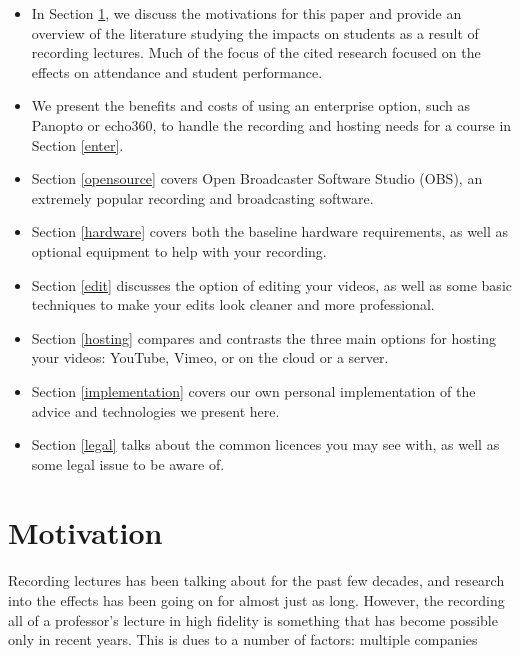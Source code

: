 \documentclass[sigconf]{acmart}
\begin{document}
\begin{itemize}
	\item In Section \ref{why}, we discuss the motivations for this paper and provide an overview of the literature studying the impacts on students as a result of recording lectures.  Much of the focus of the cited research focused on the effects on attendance and student performance.
	\item We present the benefits and costs of using an enterprise option, such as Panopto  or echo360,  to handle the recording and hosting needs for a course in Section \ref{enter}.
	\item Section \ref{opensource} covers Open Broadcaster Software Studio (OBS), an extremely popular recording and broadcasting software.
	\item Section \ref{hardware} covers both the baseline hardware requirements, as well as optional equipment to help with your recording.
	\item Section \ref{edit} discusses the option of editing your videos, as well as some basic techniques to make your edits look cleaner and more professional.
	\item Section \ref{hosting} compares and contrasts the three main options for hosting your videos: YouTube, Vimeo, or on the cloud or a server.
	\item Section \ref{implementation} covers our own personal implementation of the advice and technologies we present here.
	\item Section \ref{legal} talks about the common licences you may see with, as well as some legal issue to be aware of.
\end{itemize}
\section{Motivation}
\label{why}



Recording lectures has been talking about for the past few decades, and research into the effects has been going on for almost just as long.
However, the recording all of a professor's lecture in high fidelity is something that has become possible only in recent years.
This is dues to a number of factors: multiple companies
\end{document}
